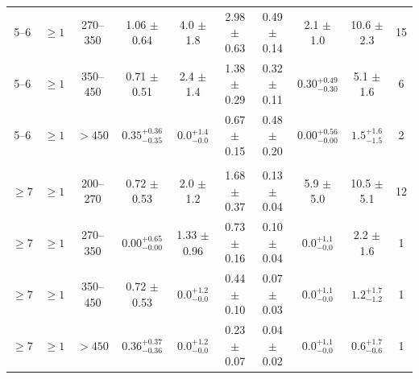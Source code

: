 \begin{table}[h!]
\begin{tabular}{cccccccccc}
5--6     & ${\geq}1$  & 270--350     & 1.06 $\pm$ 0.64       & 4.0  $\pm$ 1.8        & 2.98 $\pm$ 0.63& 0.49 $\pm$ 0.14      & 2.1 $\pm$ 1.0         & 10.6  $\pm$ 2.3       & 15 \\
5--6     & ${\geq}1$  & 350--450     & 0.71 $\pm$ 0.51       & 2.4  $\pm$ 1.4        & 1.38 $\pm$ 0.29& 0.32 $\pm$ 0.11      & $0.30_{-0.30}^{+0.49}$& 5.1 $\pm$ 1.6         & 6   \\
5--6     & ${\geq}1$  & ${>}450$     & $0.35_{-0.35}^{+0.36}$& $0.0_{-0.0}^{+1.4}$   & 0.67 $\pm$ 0.15& 0.48 $\pm$ 0.20      & $0.00_{-0.00}^{+0.56}$& $1.5_{-1.5}^{+1.6}$   & 2 \\
\\ %
${\geq}7$& ${\geq}1$  & 200--270     & 0.72 $\pm$ 0.53       & 2.0 $\pm$ 1.2         & 1.68 $\pm$ 0.37& 0.13 $\pm$ 0.04      & 5.9 $\pm$ 5.0         & 10.5 $\pm$ 5.1        & 12 \\
${\geq}7$& ${\geq}1$  & 270--350     & $0.00_{-0.00}^{+0.65}$& 1.33 $\pm$ 0.96       & 0.73 $\pm$ 0.16& 0.10 $\pm$ 0.04      & $0.0_{-0.0}^{+1.1}$   & 2.2 $\pm$ 1.6         & 1 \\
${\geq}7$& ${\geq}1$  & 350--450     & 0.72 $\pm$ 0.53       & $0.0_{-0.0}^{+1.2}$   & 0.44 $\pm$ 0.10& 0.07 $\pm$ 0.03      & $0.0_{-0.0}^{+1.1}$   & $1.2_{-1.2}^{+1.7}$   & 1 \\
${\geq}7$& ${\geq}1$  & ${>}450$     & $0.36_{-0.36}^{+0.37}$& $0.0_{-0.0}^{+1.2}$   & 0.23 $\pm$ 0.07& 0.04 $\pm$ 0.02      & $0.0_{-0.0}^{+1.1}$   & $0.6_{-0.6}^{+1.7}$   & 1 \\
\end{tabular}
\end{table}
